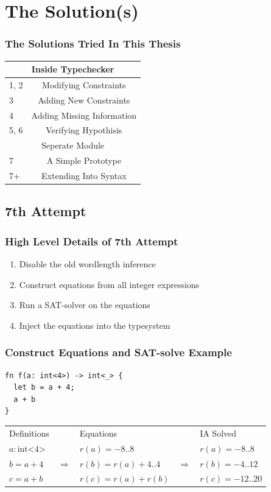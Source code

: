\documentclass{beamer}
\begin{document}

\section{The Solution(s)}

\begin{frame}
\frametitle{The Solutions Tried In This Thesis}

\centering
\begin{tabular}{l c}
 \multicolumn{2}{c}{Inside Typechecker} \\
 \hline
 1, 2 & Modifying Constraints \\
 3 & Adding New Constraints \\
 4 & Adding Missing Information \\
 5, 6 & Verifying Hypothisis \\[2em]

 \multicolumn{2}{c}{Seperate Module} \\
 \hline
 7 & A Simple Prototype \\
 7+ & Extending Into Syntax \\
\end{tabular}
\end{frame}

\subsection{7th Attempt}

\begin{frame}[containsverbatim]
\frametitle{High Level Details of 7th Attempt}
\begin{enumerate}
  \item Disable the old wordlength inference
  \item Construct equations from all integer expressions
  \item Run a SAT-solver on the equations 
  \item Inject the equations into the typesystem
\end{enumerate}
\end{frame}

\begin{frame}[containsverbatim]
\frametitle{Construct Equations and SAT-solve Example}
\begin{center}
\begin{verbatim}
fn f(a: int<4>) -> int<_> {
  let b = a + 4;
  a + b
}
\end{verbatim}
\begin{tabular}{l c l c l}
 Definitions & & Equations & & IA Solved \\
 $a : \textrm{int<}4\textrm{>}$ & & $r(a) = -8..8$ & & $r(a) = -8..8$ \\
 $b = a + 4$ & $\Rightarrow$ & $r(b) = r(a) + 4..4$ & $\Rightarrow$ & $r(b) = -4..12$\\
 $c = a + b$ & & $r(c) = r(a) + r(b)$ & & $r(c) = -12..20$ \\
\end{tabular}
\end{center}
\end{frame}
\end{document}
